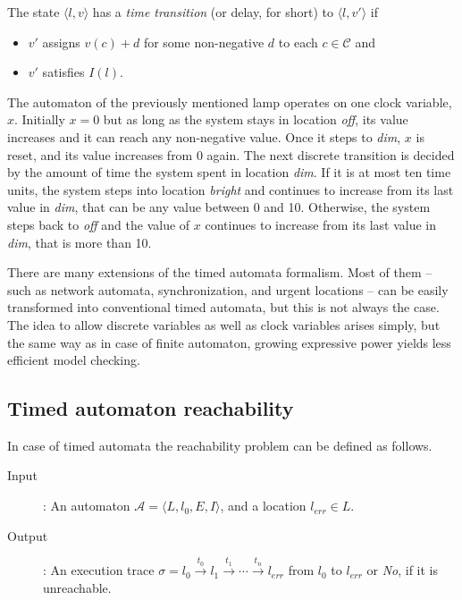 \begin{dfn}
The state $\langle l,v \rangle$ has a \emph{time transition} (or delay, for short) to $\langle l,v' \rangle$ if
\begin{itemize}
	\item $v'$ assigns $v(c)+d$ for some non-negative $d$ to each $c \in \mathcal{C}$ and
	\item $v'$ satisfies $I(l)$. 
\end{itemize}
\end{dfn}

\begin{example}
	The automaton of the previously mentioned lamp operates on one clock variable, $x$. Initially $x=0$ but as long as the system stays in location \emph{off}, its value increases and it can reach any non-negative value. Once it steps to \emph{dim}, $x$ is reset, and its value increases from 0 again. The next discrete transition is decided by the amount of time the system spent in location \emph{dim}. If it is at most ten time units, the system steps into location \emph{bright} and continues to increase from its last value in \emph{dim}, that can be any value between 0 and 10. Otherwise, the system steps back to \emph{off} and the value of $x$ continues to increase from its last value in \emph{dim}, that is more than 10.
\end{example}

There are many extensions of the timed automata formalism. Most of them -- such as network automata, synchronization, and urgent locations -- can be easily transformed into conventional timed automata, but this is not always the case. The idea to allow discrete variables as well as clock variables arises simply, but the same way as in case of finite automaton, growing expressive power yields less efficient model checking.


\subsection{Timed automaton reachability} \label{sec:tareach}

In case of timed automata the reachability problem can be defined as follows.

\begin{description}
	\item [Input]: An automaton $\mathcal{A}=\langle L, l_0,
	E, I\rangle$, and a location $l_{err} \in L$.
	\item[Output]: An execution trace $\sigma=l_0 \xrightarrow{t_0} l_1 \xrightarrow{t_1} \cdots \xrightarrow{t_n} l_{err}$ from $l_0$ to $l_{err}$ or \emph{No}, if it is unreachable.
\end{description}


